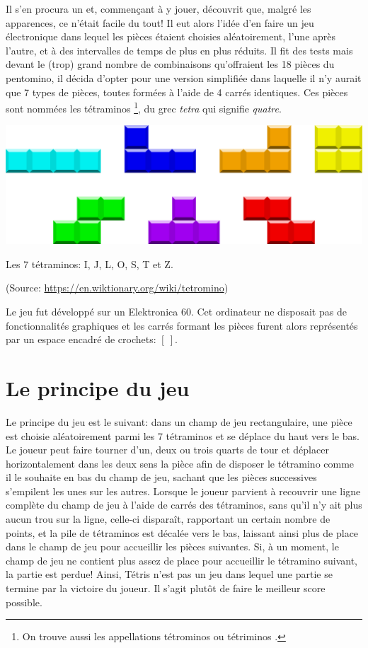 Il s'en procura un et, commençant à y jouer, découvrit que, malgré les apparences, ce n'était facile du tout! Il eut alors l'idée d'en faire un jeu électronique dans lequel les pièces étaient choisies aléatoirement, l'une après l'autre, et à des intervalles de temps de plus en plus réduits. Il fit des tests mais devant le (trop) grand nombre de combinaisons qu'offraient les 18 pièces du pentomino, il décida d'opter pour une version simplifiée dans laquelle il n'y aurait que 7 types de pièces, toutes formées à l'aide de 4 carrés identiques. Ces pièces sont nommées les \og tétraminos \fg{}\footnote{On trouve aussi les appellations \og tétrominos \fg{} ou \og tétriminos \fg{}.}, du grec \textit{tetra} qui signifie \textit{quatre}. 

\begin{center}
	\includegraphics[scale=0.3]{media/tetromino.png}
	
	\medskip
	
	Les 7 tétraminos: I, J, L, O, S, T et Z.
	
	(Source: \url{https://en.wiktionary.org/wiki/tetromino})
\end{center}

Le jeu fut développé sur un Elektronica 60. Cet ordinateur ne disposait pas de fonctionnalités graphiques et les carrés formant les pièces furent alors représentés par un espace encadré de crochets: $[~]$.

\section{Le principe du jeu}

Le principe du jeu est le suivant: dans un champ de jeu rectangulaire, une pièce est choisie aléatoirement parmi les 7 tétraminos et se déplace du haut vers le bas. Le joueur peut faire tourner d'un, deux ou trois quarts de tour et déplacer horizontalement dans les deux sens la pièce afin de disposer le tétramino comme il le souhaite en bas du champ de jeu, sachant que les pièces successives s'empilent les unes sur les autres. Lorsque le joueur parvient à recouvrir une ligne complète du champ de jeu à l'aide de carrés des tétraminos, sans qu'il n'y ait plus aucun trou sur la ligne, celle-ci disparaît, rapportant un certain nombre de points, et la pile de tétraminos est décalée vers le bas, laissant ainsi plus de place dans le champ de jeu pour accueillir les pièces suivantes. Si, à un moment, le champ de jeu ne contient plus assez de place pour accueillir le tétramino suivant, la partie est perdue! Ainsi, Tétris n'est pas un jeu dans lequel une partie se termine par la victoire du joueur. Il s'agit plutôt de faire le meilleur score possible.

